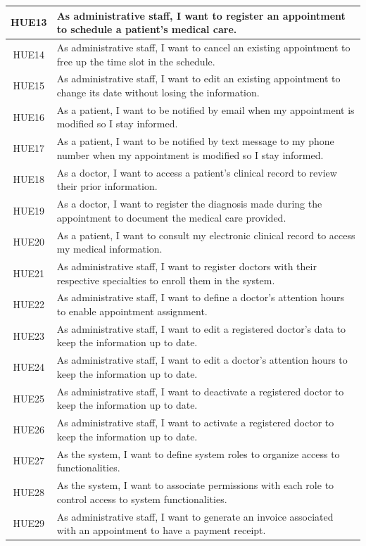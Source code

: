 \documentclass{prgrado}
\begin{document}
\begin{longtable}{|c|p{12cm}|}
HUE13 & As administrative staff, I want to register an appointment to schedule a patient's medical care. \\ \hline
HUE14 & As administrative staff, I want to cancel an existing appointment to free up the time slot in the schedule. \\ \hline
HUE15 & As administrative staff, I want to edit an existing appointment to change its date without losing the information. \\ \hline
HUE16 & As a patient, I want to be notified by email when my appointment is modified so I stay informed. \\ \hline
HUE17 & As a patient, I want to be notified by text message to my phone number when my appointment is modified so I stay informed. \\ \hline
HUE18 & As a doctor, I want to access a patient's clinical record to review their prior information. \\ \hline
HUE19 & As a doctor, I want to register the diagnosis made during the appointment to document the medical care provided. \\ \hline
HUE20 & As a patient, I want to consult my electronic clinical record to access my medical information. \\ \hline
HUE21 & As administrative staff, I want to register doctors with their respective specialties to enroll them in the system. \\ \hline
HUE22 & As administrative staff, I want to define a doctor's attention hours to enable appointment assignment. \\ \hline
HUE23 & As administrative staff, I want to edit a registered doctor's data to keep the information up to date. \\ \hline
HUE24 & As administrative staff, I want to edit a doctor's attention hours to keep the information up to date. \\ \hline
HUE25 & As administrative staff, I want to deactivate a registered doctor to keep the information up to date. \\ \hline
HUE26 & As administrative staff, I want to activate a registered doctor to keep the information up to date. \\ \hline
HUE27 & As the system, I want to define system roles to organize access to functionalities. \\ \hline
HUE28 & As the system, I want to associate permissions with each role to control access to system functionalities. \\ \hline
HUE29 & As administrative staff, I want to generate an invoice associated with an appointment to have a payment receipt. \\ \hline

\end{longtable}
\end{document}
